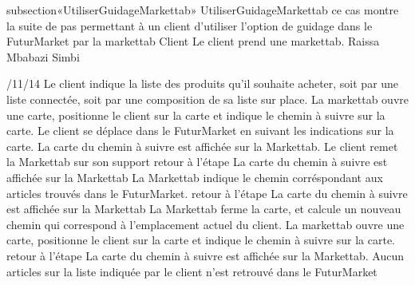 subsection{«UtiliserGuidageMarkettab»}
\startCU
\nom UtiliserGuidageMarkettab
\but ce cas montre la suite de pas permettant à un client d'utiliser l'option de guidage dans le FuturMarket par la markettab
\acteur Client
\precondition Le client prend une markettab.
\auteur Raissa Mbabazi Simbi
\date 7/11/14
\nominal %
\startnominal
{} Le client indique la liste des produits qu'il souhaite acheter, soit par une liste connectée, soit par une composition de sa liste sur place.
\etape[UGM:SE1] La markettab ouvre une carte, positionne le client sur la carte et indique le chemin à suivre sur la carte.
 Le client se déplace dans le FuturMarket en suivant les indications sur la carte.
\stopnominal
\postcondition La carte du chemin à suivre est affichée sur la Markettab.
\alternatifs
{}
\etape Le client remet la Markettab sur son support
\etape retour à l'étape 
\stopcondition
\postcondition La carte du chemin à suivre est affichée sur la Markettab
\stopalternatif
\startalternatif[UGM:SE1]
\etape La Markettab indique le chemin corréspondant aux articles trouvés dans le FuturMarket.
\etape retour à l'étape 
\stopcondition
\postcondition La carte du chemin à suivre est affichée sur la Markettab
\stopalternatif
\startalternatif[UGM:SE1]
\etape La Markettab ferme la carte, et calcule un nouveau chemin qui correspond à l'emplacement actuel du client. 
\etape La markettab ouvre une carte, positionne le client sur la carte et indique le chemin à suivre sur la carte.
\etape retour à l'étape 
\stopcondition
\postcondition La carte du chemin à suivre est affichée sur la Markettab.
\stopalternatif
\exception
Aucun articles sur la liste indiquée par le client n'est retrouvé dans le FuturMarket
\stopCU
